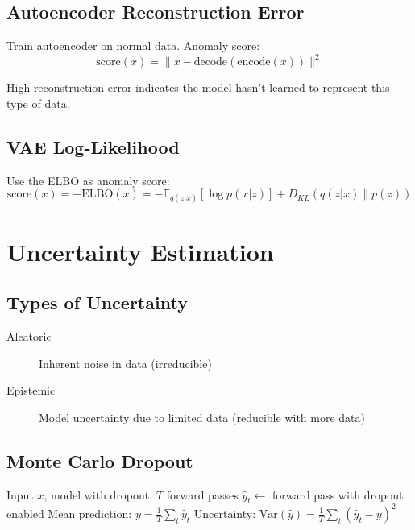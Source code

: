 \subsection{Autoencoder Reconstruction Error}

Train autoencoder on normal data. Anomaly score:
\begin{equation}
    \text{score}(x) = \|x - \text{decode}(\text{encode}(x))\|^2
\end{equation}

High reconstruction error indicates the model hasn't learned to represent this type of data.

\subsection{VAE Log-Likelihood}

Use the ELBO as anomaly score:
\begin{equation}
    \text{score}(x) = -\text{ELBO}(x) = -\mathbb{E}_{q(z|x)}[\log p(x|z)] + D_{KL}(q(z|x) \| p(z))
\end{equation}


\section{Uncertainty Estimation}


\subsection{Types of Uncertainty}

\begin{description}
    \item[Aleatoric] Inherent noise in data (irreducible)
    \item[Epistemic] Model uncertainty due to limited data (reducible with more data)
\end{description}

\subsection{Monte Carlo Dropout}

\begin{algorithm}[H]
\caption{MC Dropout for Uncertainty}
\begin{algorithmic}[1]
\Require Input $x$, model with dropout, $T$ forward passes
    \State $\hat{y}_t \gets$ forward pass with dropout enabled
\EndFor
\State Mean prediction: $\bar{y} = \frac{1}{T} \sum_t \hat{y}_t$
\State Uncertainty: $\text{Var}(\hat{y}) = \frac{1}{T} \sum_t (\hat{y}_t - \bar{y})^2$
\end{algorithmic}
\end{algorithm}

